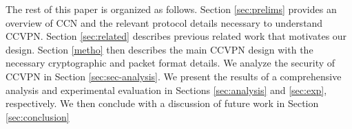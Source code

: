 The rest of this paper is organized as follows. Section \ref{sec:prelims} provides
an overview of CCN and the relevant protocol details necessary to understand
CCVPN. Section \ref{sec:related} describes previous related work that motivates
our design. Section \ref{metho} then describes the main CCVPN design with the necessary
cryptographic and packet format details. We analyze the security of CCVPN
in Section \ref{sec:sec-analysis}. We present the results of a comprehensive
analysis and experimental evaluation in Sections \ref{sec:analysis} and \ref{sec:exp},
respectively. We then conclude with a discussion of future work in Section \ref{sec:conclusion}
